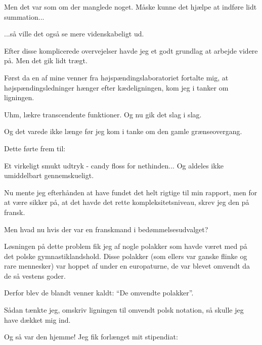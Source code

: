 \documentclass[a4paper,11pt]{article}
\begin{document}
\begin{sketch}
   Men det var som om der manglede noget.  Måske kunne det
  hjælpe at indføre lidt summation...


   ...så ville det også se mere videnskabeligt ud.


   Efter disse komplicerede overvejelser havde jeg et godt
  grundlag at arbejde videre på.  Men det gik lidt trægt.

   Først da en af mine venner fra højspændingslaboratoriet
  fortalte mig, at højspændingsledninger hænger efter kædeligningen,
  kom jeg i tanker om ligningen.


   Uhm, lækre transcendente funktioner.  Og nu gik det slag i slag.

   Og det varede ikke længe før jeg kom i tanke om den gamle grænseovergang.


   Dette førte frem til:


   Et virkeligt smukt udtryk - candy floss for nethinden... Og
  aldeles ikke umiddelbart gennemskueligt.

   Nu mente jeg efterhånden at have fundet det helt rigtige
  til min rapport, men for at være sikker på, at det havde det rette
  kompleksitetsniveau, skrev jeg den på fransk.

   Men hvad nu hvis der var en franskmand i
  bedømmelsesudvalget?

   Løsningen på dette problem fik jeg af nogle polakker som
  havde været med på det polske gymnastiklandshold.  Disse polakker
  (som ellers var ganske flinke og rare mennesker) var hoppet af under
  en europaturne, de var blevet omvendt da de så vestens goder.

   Derfor blev de blandt venner kaldt: "`De omvendte polakker"'.

   Sådan tænkte jeg, omskriv ligningen til omvendt polsk
  notation, så skulle jeg have dækket mig ind.


   Og så var den hjemme!  Jeg fik forlænget mit stipendiat:

 \scene{\[1\ 1\ z\ /\ +\ z\ \uparrow\ \lim_{z\rightarrow\infty}\ln\ x\ \sin\ 2
   \uparrow\ x\ \cos\ 2\ \uparrow\ +\ +\ y\ \cosh\ 1\ y\ \tanh\ 2\ \uparrow\ -
   \sqrt{}\ \cdot\ 4\ \log_{2}\ n\ \uparrow\ \sum_{n=0}^{\infty}\]}

\end{sketch}
\end{document}
